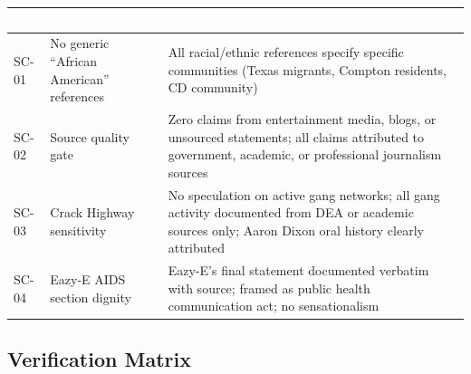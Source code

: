 \documentclass[11pt,letterpaper]{article}
\newcommand{\tableheader}[1]{\textbf{\sffamily\textcolor{white}{#1}}}
\begin{document}
\begin{center}
\begin{tabularx}{\textwidth}{C{1.5cm}L{3.5cm}X}
\toprule
{}
\tableheader{ID} & \tableheader{Verifies} & \tableheader{Expected Result} \\
\midrule
SC-01 & No generic ``African American'' references & All racial/ethnic references specify specific communities (Texas migrants, Compton residents, CD community) \\
SC-02 & Source quality gate & Zero claims from entertainment media, blogs, or unsourced statements; all claims attributed to government, academic, or professional journalism sources \\
SC-03 & Crack Highway sensitivity & No speculation on active gang networks; all gang activity documented from DEA or academic sources only; Aaron Dixon oral history clearly attributed \\
SC-04 & Eazy-E AIDS section dignity & Eazy-E's final statement documented verbatim with source; framed as public health communication act; no sensationalism \\
\bottomrule
\end{tabularx}
\end{center}

\subsection{Verification Matrix}
\end{document}
